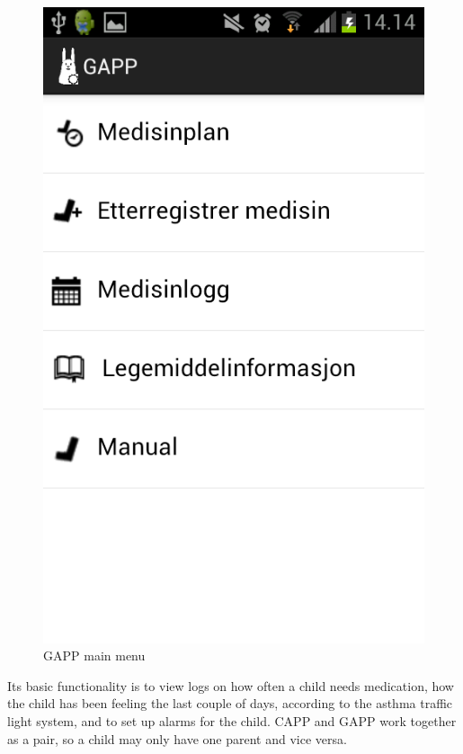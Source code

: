 \begin{figure}
		\centering
			\includegraphics[width=0.20\paperwidth]{Pictures/app-screenshots/gapp_main_menu.png}
		\caption{GAPP main menu}
		\label{fig:gapp-main-menu}
\end{figure}
Its basic functionality is to view logs on how often a child needs medication, how the child has been feeling the last couple of days, according to the asthma traffic light system, and to set up alarms for the child. 
CAPP and GAPP work together as a pair, so a child may only have one parent and vice versa. %


